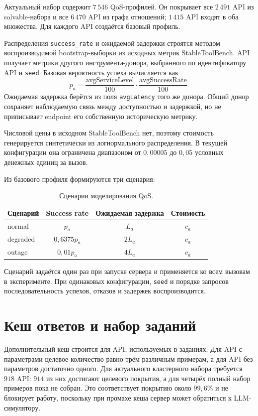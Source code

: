 \documentclass[12pt,a4paper]{article}
\begin{document}
Актуальный набор содержит $7\,546$ QoS-профилей. Он покрывает все $2\,491$ API
из solvable-набора и все $6\,470$ API из графа отношений; $1\,415$ API входят
в оба множества. Для каждого API создаётся базовый профиль.

Распределения \texttt{success\_rate} и ожидаемой задержки строятся методом
воспроизводимой bootstrap-выборки из исходных метрик StableToolBench. API
получает метрики другого инструмента-донора, выбранного по идентификатору API и
\texttt{seed}. Базовая вероятность успеха вычисляется как
\[
p_a = \frac{\mathrm{avgServiceLevel}}{100}
      \cdot
      \frac{\mathrm{avgSuccessRate}}{100}.
\]
Ожидаемая задержка берётся из поля \texttt{avgLatency} того же донора. Общий
донор сохраняет наблюдаемую связь между доступностью и задержкой, но не
приписывает endpoint его собственную историческую метрику.

Числовой цены в исходном StableToolBench нет, поэтому стоимость генерируется
синтетически из логнормального распределения. В текущей конфигурации она
ограничена диапазоном от $0{,}00005$ до $0{,}05$ условных денежных единиц за
вызов.

Из базового профиля формируются три сценария:
\begin{table}[ht]
    \centering
    \begin{tabular}{lccc}
        \toprule
        Сценарий & Success rate & Ожидаемая задержка & Стоимость \\
        \midrule
        normal   & $p_a$         & $L_a$  & $c_a$ \\
        degraded & $0{,}6375p_a$ & $2L_a$ & $c_a$ \\
        outage   & $0{,}01p_a$   & $4L_a$ & $c_a$ \\
        \bottomrule
    \end{tabular}
    \caption{Сценарии моделирования QoS.}
\end{table}

Сценарий задаётся один раз при запуске сервера и применяется ко всем вызовам в
эксперименте. При одинаковых конфигурации, \texttt{seed} и порядке запросов
последовательность успехов, отказов и задержек воспроизводится.

\section{Кеш ответов и набор заданий}

Дополнительный кеш строится для API, используемых в заданиях. Для API с
параметрами целевое количество равно трём различным примерам, а для API без
параметров достаточно одного. Для актуального кластерного набора требуется
$918$ API: $914$ из них достигают целевого покрытия, а для четырёх полный набор
примеров пока не собран. Это соответствует покрытию около $99{,}6\%$ и не
блокирует работу, поскольку при промахе кеша сервер может обратиться к
LLM-симулятору.
\end{document}
